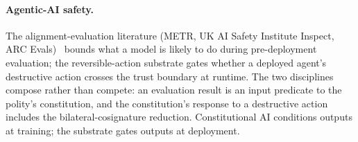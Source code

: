 \paragraph{Agentic-AI safety.}
The alignment-evaluation literature (METR, UK AI Safety Institute
Inspect, ARC Evals)~\cite{alignmentEvalHarnessesPlaceholder} bounds what a model is likely
to do during pre-deployment evaluation; the reversible-action substrate
gates whether a deployed agent's destructive action crosses the trust
boundary at runtime. The two disciplines compose rather than compete:
an evaluation result is an input predicate to the polity's
constitution, and the constitution's response to a destructive action
includes the bilateral-cosignature reduction. Constitutional AI
conditions outputs at training; the substrate gates outputs at
deployment.

